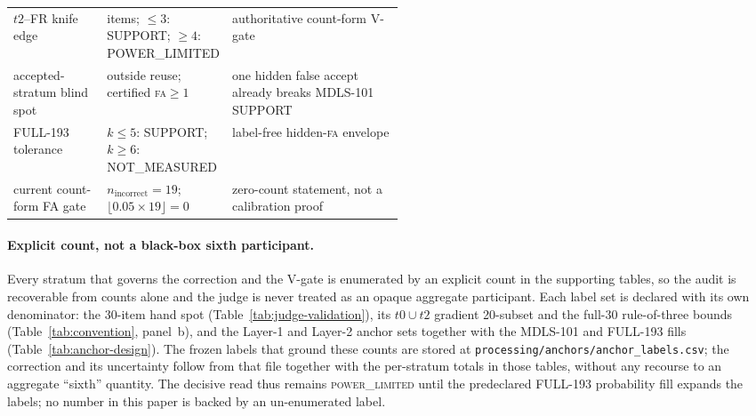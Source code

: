 \documentclass{article}
\begin{document}
\begin{table}[t]
\begin{tabularx}{\linewidth}{@{}>{\raggedright\arraybackslash}p{0.24\linewidth}>{\raggedright\arraybackslash}p{0.27\linewidth}X@{}}
$t2$--FR knife edge & 30 items; $\le3$: SUPPORT; $\ge4$: POWER\_LIMITED & authoritative count-form V-gate \\
accepted-stratum blind spot & 92 outside reuse; certified \textsc{fa}$\ge1$ & one hidden false accept already breaks MDLS-101 SUPPORT \\
FULL-193 tolerance & $k\le5$: SUPPORT; $k\ge6$: NOT\_MEASURED & label-free hidden-\textsc{fa} envelope \\
current count-form FA gate & $n_{\mathrm{incorrect}}=19$; $\lfloor0.05\times19\rfloor=0$ & zero-count statement, not a calibration proof \\
\bottomrule
\end{tabularx}
\end{table}

\paragraph{Explicit count, not a black-box sixth participant.}
Every stratum that governs the correction and the V-gate is enumerated by an
explicit count in the supporting tables, so the audit is recoverable from counts
alone and the judge is never treated as an opaque aggregate participant.  Each label
set is declared with its own denominator: the 30-item hand spot
(Table~\ref{tab:judge-validation}), its $t0\cup t2$ gradient 20-subset and the
full-30 rule-of-three bounds \citep{vanbelle2008rules}
(Table~\ref{tab:convention}, panel~b), and the Layer-1
and Layer-2 anchor sets together with the MDLS-101 and FULL-193 fills
(Table~\ref{tab:anchor-design}).  The frozen labels that ground these counts are
stored at \nolinkurl{processing/anchors/anchor_labels.csv}; the correction and its
uncertainty follow from that file together with the per-stratum totals in those
tables, without any recourse to an aggregate ``sixth'' quantity.  The decisive read
thus remains \textsc{power\_limited} until the predeclared FULL-193 probability fill
expands the labels; no number in this paper is backed by an un-enumerated label.
\end{document}
